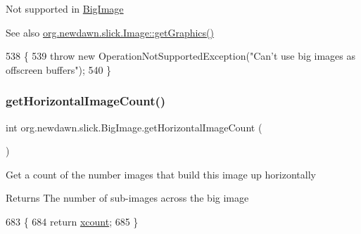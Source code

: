 Not supported in \mbox{\hyperlink{classorg_1_1newdawn_1_1slick_1_1_big_image}{Big\+Image}}

\begin{DoxySeeAlso}{See also}
\mbox{\hyperlink{classorg_1_1newdawn_1_1slick_1_1_image_aa4b12d568452597b58cdb69d49e625a4}{org.\+newdawn.\+slick.\+Image\+::get\+Graphics()}} 
\end{DoxySeeAlso}

\begin{DoxyCode}
538                                                         \{
539         \textcolor{keywordflow}{throw} \textcolor{keyword}{new} OperationNotSupportedException(\textcolor{stringliteral}{"Can't use big images as offscreen buffers"});
540     \}
\end{DoxyCode}
\mbox{\label{classorg_1_1newdawn_1_1slick_1_1_big_image_a578791d37d1539bd763d568f7223ce99}} 
\subsubsection{\texorpdfstring{get\+Horizontal\+Image\+Count()}{getHorizontalImageCount()}}
{\footnotesize\ttfamily int org.\+newdawn.\+slick.\+Big\+Image.\+get\+Horizontal\+Image\+Count (\begin{DoxyParamCaption}{ }\end{DoxyParamCaption})\hspace{0.3cm}{\ttfamily [inline]}}

Get a count of the number images that build this image up horizontally

\begin{DoxyReturn}{Returns}
The number of sub-\/images across the big image 
\end{DoxyReturn}

\begin{DoxyCode}
683                                          \{
684          \textcolor{keywordflow}{return} \mbox{\hyperlink{classorg_1_1newdawn_1_1slick_1_1_big_image_ae42c6b98e3a7924bf005b1b356cca4c2}{xcount}};
685     \}
\end{DoxyCode}
\mbox{\label{classorg_1_1newdawn_1_1slick_1_1_big_image_a9f630e56a300dc74c6403b290a56c059}} 
